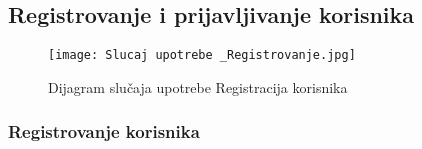 \documentclass[a4paper]{article}
\begin{document}

\subsection{Registrovanje i prijavljivanje korisnika}

\begin{figure}[htp]
    \centering
    \texttt{[image: Slucaj upotrebe \_Registrovanje.jpg]}
    \caption{Dijagram slučaja upotrebe Registracija korisnika}
    \label{fig:Registracija}
\end{figure}

\subsubsection{Registrovanje korisnika}
\end{document}

